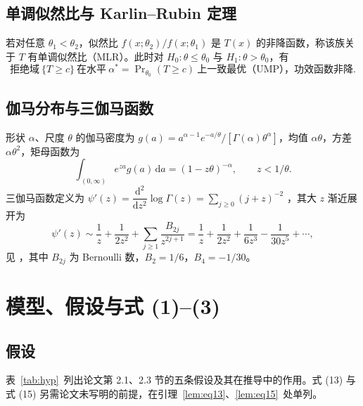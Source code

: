 \documentclass[fontset=none,11pt,a4paper,fleqn]{ctexart}
\numberwithin{equation}{section}
\theoremstyle{zhthm}
\theoremstyle{zhrem}
\begin{document}
\subsection{单调似然比与 Karlin--Rubin 定理}

若对任意 $\theta_1<\theta_2$，似然比 $f(x;\theta_2)/f(x;\theta_1)$ 是 $T(x)$ 的非降函数，称该族关于 $T$ 有单调似然比（MLR）。此时对 $H_0:\theta\le\theta_0$ 与 $H_1:\theta>\theta_0$，有 \citep{karlin1956theory,lehmann2005testing}
\begin{equation}
\text{拒绝域}\ \{T\ge c\}\ \text{在水平}\ \alpha^*=\Pr\nolimits_{\theta_0}(T\ge c)\ \text{上一致最优（UMP），功效函数非降}.
\tag{P11}
\end{equation}

\subsection{伽马分布与三伽马函数}

形状 $\alpha$、尺度 $\theta$ 的伽马密度为 $g(a)=a^{\alpha-1}e^{-a/\theta}/[\Gamma(\alpha)\theta^\alpha]$，均值 $\alpha\theta$，方差 $\alpha\theta^2$，矩母函数为
\begin{equation}
\int_{\,(0,\infty)} e^{za}g(a)\,\mathrm da=(1-z\theta)^{-\alpha},\qquad z<1/\theta.
\tag{P12}
\end{equation}
三伽马函数定义为 $\psi'(z)=\dfrac{\mathrm d^2}{\mathrm dz^2}\log\Gamma(z)=\sum_{j\ge0}(j+z)^{-2}$ \citep[式 5.15.1]{dlmf}，其大 $z$ 渐近展开为
\begin{equation}
\psi'(z)\sim\frac1z+\frac1{2z^2}+\sum_{j\ge1}\frac{B_{2j}}{z^{2j+1}}
=\frac1z+\frac1{2z^2}+\frac1{6z^3}-\frac1{30z^5}+\cdots,
\tag{P13}
\end{equation}
见 \citet[式 5.15.8]{dlmf}，其中 $B_{2j}$ 为 Bernoulli 数，$B_2=1/6$，$B_4=-1/30$。

\section{模型、假设与式 (1)--(3)}\label{sec:model}

\subsection{假设}

表~\ref{tab:hyp}~列出论文第 2.1、2.3 节的五条假设及其在推导中的作用。式 (13) 与式 (15) 另需论文未写明的前提，在引理~\ref{lem:eq13}、\ref{lem:eq15}~处单列。
\end{document}
